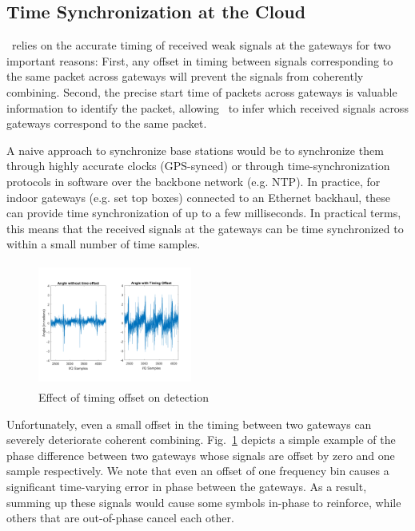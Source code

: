 \subsection{Time Synchronization at the Cloud}
\name\ relies on the accurate timing of received weak signals at the gateways for two important reasons: First, any offset in timing between signals corresponding to the same packet across  gateways will prevent the signals from coherently combining. Second, the precise start time of packets across gateways is valuable information to identify the packet, allowing \name\ to infer which received signals across gateways correspond to the same packet.

A naive approach to synchronize base stations would be to synchronize them through highly accurate clocks (GPS-synced) or through time-synchronization protocols in software over the backbone network (e.g. NTP). In practice, for indoor gateways (e.g. set top boxes) connected to an Ethernet backhaul, these can provide time synchronization of up to a few milliseconds. In practical terms, this means that the received signals at the gateways can be time synchronized to within a small number of time samples. 

\begin{figure}
    \centering
    \includegraphics[width=0.45\textwidth, height=1.6in]{location-aware-network/figures/TimeOffset.pdf}
    \vspace*{-0.1in}
    \caption{Effect of timing offset on detection}
        \vspace*{-0.0in}

    \label{fig:toffset}
    \compactimg
\end{figure}

Unfortunately, even a small offset in the timing between two gateways can severely deteriorate coherent combining. Fig.~\ref{fig:toffset} depicts a simple example of the phase difference between two gateways whose signals are offset by zero and one sample respectively. We note that even an offset of one frequency bin causes a significant time-varying error in phase between the gateways. As a result, summing up these signals would cause some symbols in-phase to reinforce, while others that are out-of-phase cancel each other. \vspace*{0.1in}

